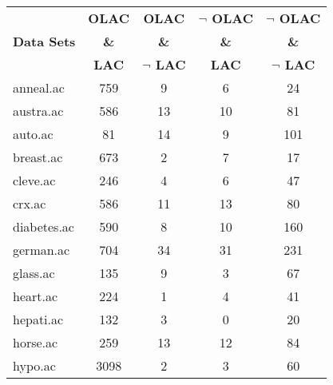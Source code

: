 \begin{table}[htbp]
	\centering
		\begin{tabular}{|l|c|c|c|c|}
		\hline
				& \textbf{OLAC}		& \textbf{OLAC}			& \textbf{$\neg$ OLAC}	& \textbf{$\neg$ OLAC}	\\
		\textbf{Data Sets}	& \textbf{\&}		& \textbf{\&}			& \textbf{\&}			& \textbf{\&}			\\
				& \textbf{LAC}		& \textbf{$\neg$ LAC}		& \textbf{LAC}			& \textbf{$\neg$ LAC}		\\
		\hline
		anneal.ac       & 759           & 9                  & 6                        & 24                            \\
		\hline
		austra.ac       & 586           & 13                 & 10                       & 81                            \\
		\hline
		auto.ac         & 81            & 14                 & 9                        & 101                           \\
		\hline
		breast.ac       & 673           & 2                  & 7                        & 17                            \\
		\hline
		cleve.ac        & 246           & 4                  & 6                        & 47                            \\
		\hline
		crx.ac          & 586           & 11                 & 13                       & 80                            \\
		\hline
		diabetes.ac     & 590           & 8                  & 10                       & 160                           \\
		\hline
		german.ac       & 704           & 34                 & 31                       & 231                           \\
		\hline
		glass.ac        & 135           & 9                  & 3                        & 67                            \\
		\hline
		heart.ac        & 224           & 1                  & 4                        & 41                            \\
		\hline
		hepati.ac       & 132           & 3                  & 0                        & 20                            \\
		\hline
		horse.ac        & 259           & 13                 & 12                       & 84                            \\
		\hline
		hypo.ac         & 3098          & 2                  & 3                        & 60                            \\

\end{tabular}
\end{table}
